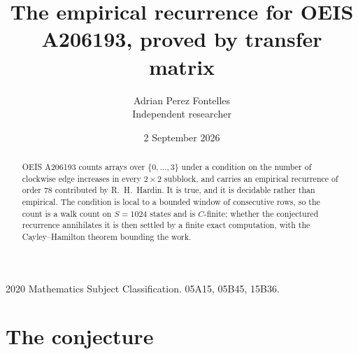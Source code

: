 \documentclass[11pt,a4paper]{article}
\title{The empirical recurrence for OEIS A206193, proved by transfer matrix}
\author{Adrian Perez Fontelles\\ \small Independent researcher}
\date{2 September 2026}
\theoremstyle{plain}
\theoremstyle{definition}
\begin{document}
\maketitle

\begin{abstract}
OEIS A206193 counts arrays over $\{0,\dots,3\}$ under a condition on the number of clockwise edge increases
in every $2\times2$ subblock, and carries an empirical recurrence of order $78$ contributed by
R.~H.~Hardin. It is true, and it is decidable rather than empirical. The condition is local to
a bounded window of consecutive rows, so the count is a walk count on $S=1024$ states and is
$C$-finite; whether the conjectured recurrence annihilates it is then settled by a finite exact
computation, with the Cayley--Hamilton theorem bounding the work.
\end{abstract}

\noindent\small 2020 Mathematics Subject Classification. 05A15, 05B45, 15B36.\normalsize

\section{The conjecture}
\end{document}
